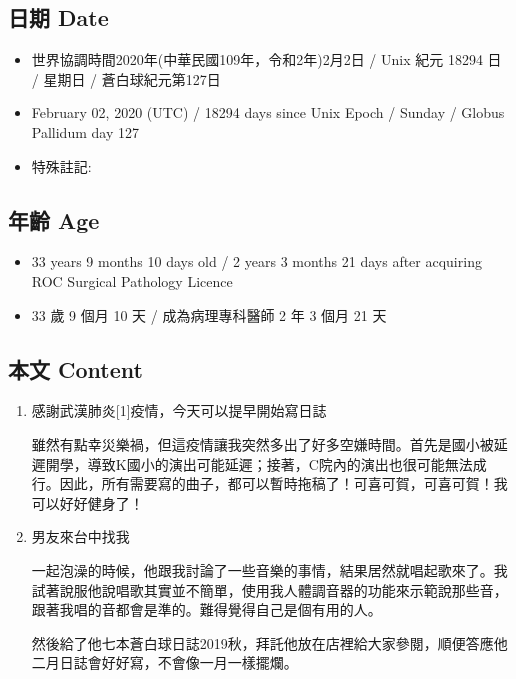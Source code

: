 \documentclass[
]{article}
\providecommand{\tightlist}{%
  \setlength{\itemsep}{0pt}\setlength{\parskip}{0pt}}
\begin{document}
\hypertarget{ux65e5ux671f-date-63}{%
\subsection{日期 Date}\label{ux65e5ux671f-date-63}}

\begin{itemize}
\tightlist
\item
  世界協調時間2020年(中華民國109年，令和2年)2月2日 / Unix 紀元 18294 日
  / 星期日 / 蒼白球紀元第127日
\item
  February 02, 2020 (UTC) / 18294 days since Unix Epoch / Sunday /
  Globus Pallidum day 127
\item
  特殊註記:
\end{itemize}

\hypertarget{ux5e74ux9f61-age-63}{%
\subsection{年齡 Age}\label{ux5e74ux9f61-age-63}}

\begin{itemize}
\tightlist
\item
  33 years 9 months 10 days old / 2 years 3 months 21 days after
  acquiring ROC Surgical Pathology Licence
\item
  33 歲 9 個月 10 天 / 成為病理專科醫師 2 年 3 個月 21 天
\end{itemize}

\hypertarget{ux672cux6587-content-63}{%
\subsection{本文 Content}\label{ux672cux6587-content-63}}

\begin{enumerate}
\def\labelenumi{\arabic{enumi}.}
\item
  感謝武漢肺炎{[}1{]}疫情，今天可以提早開始寫日誌

  雖然有點幸災樂禍，但這疫情讓我突然多出了好多空嫌時間。首先是國小被延遲開學，導致K國小的演出可能延遲；接著，C院內的演出也很可能無法成行。因此，所有需要寫的曲子，都可以暫時拖稿了！可喜可賀，可喜可賀！我可以好好健身了！
\item
  男友來台中找我

  一起泡澡的時候，他跟我討論了一些音樂的事情，結果居然就唱起歌來了。我試著說服他說唱歌其實並不簡單，使用我人體調音器的功能來示範說那些音，跟著我唱的音都會是準的。難得覺得自己是個有用的人。

  然後給了他七本蒼白球日誌2019秋，拜託他放在店裡給大家參閱，順便答應他二月日誌會好好寫，不會像一月一樣擺爛。
\end{enumerate}
\end{document}
